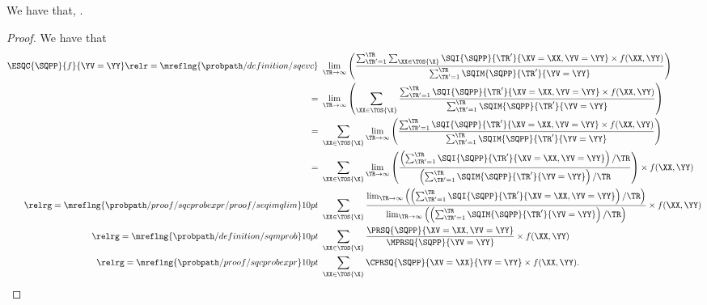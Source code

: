 \begin{proposition}
  We have that, \evsqcexprprop.%
\end{proposition}

\begin{proof}
  We have that
  \begin{align*}
    \ESQC{\SQPP}{f}{\YV = \YY} \relr = {\mreflng{\probpath/definition/sqevc}} \ &\lim_{\TR \rightarrow \infty}
    \left(
    \frac
    {\sum_{\TR' = 1}^{\TR}\sum_{\XX\in\TOS{\X}}\SQI{\SQPP}{\TR'}{\XV = \XX, \YV = \YY}\times f(\XX, \YY)}
    {\sum_{\TR' = 1}^{\TR}\SQIM{\SQPP}{\TR'}{\YV = \YY}}
    \right)\\
    = \ &\lim_{\TR \rightarrow \infty}
    \left(
    \sum_{\XX\in\TOS{\X}}
    \frac
    {\sum_{\TR' = 1}^{\TR}\SQI{\SQPP}{\TR'}{\XV = \XX, \YV = \YY}\times f(\XX, \YY)}
    {\sum_{\TR' = 1}^{\TR}\SQIM{\SQPP}{\TR'}{\YV = \YY}}
    \right)\\
    = \ &
    \sum_{\XX\in\TOS{\X}}
    \lim_{\TR \rightarrow \infty}
    \left(
    \frac
    {\sum_{\TR' = 1}^{\TR}\SQI{\SQPP}{\TR'}{\XV = \XX, \YV = \YY}\times f(\XX, \YY)}
    {\sum_{\TR' = 1}^{\TR}\SQIM{\SQPP}{\TR'}{\YV = \YY}}
    \right)\\
    = \ &
    \sum_{\XX\in\TOS{\X}}
    \lim_{\TR \rightarrow \infty}
    \left(
    \frac
    {\left({\sum_{\TR' = 1}^{\TR}\SQI{\SQPP}{\TR'}{\XV = \XX, \YV = \YY}}\right)/{\TR}}
    {\left(\sum_{\TR' = 1}^{\TR}\SQIM{\SQPP}{\TR'}{\YV = \YY}\right)/\TR}
    \right)
    \times f(\XX, \YY)\\
    \relrg = {\mreflng{\probpath/proof/sqcprobexpr/proof/seqimqlim}} 10pt \ & 
    \sum_{\XX\in\TOS{\X}}
    \frac
    {
      \lim_{\TR \rightarrow \infty}\left(
    \left({\sum_{\TR' = 1}^{\TR}\SQI{\SQPP}{\TR'}{\XV = \XX, \YV = \YY}}\right)/{\TR}\right)}
    {
      \lim_{\TR \rightarrow \infty}\left(
    \left(\sum_{\TR' = 1}^{\TR}\SQIM{\SQPP}{\TR'}{\YV = \YY}\right)/\TR\right)}
    \times f(\XX, \YY)
    \\
    \relrg = {\mreflng{\probpath/definition/sqmprob}} 10pt \ & 
    \sum_{\XX\in\TOS{\X}} \frac { \PRSQ{\SQPP}{\XV = \XX, \YV = \YY} } { \MPRSQ{\SQPP}{\YV = \YY} } 
    \times f(\XX, \YY) \\
    \relrg = {\mreflng{\probpath/proof/sqcprobexpr}} 10pt \ & 
    \sum_{\XX \in \TOS{\X}}\CPRSQ{\SQPP}{\XV = \XX}{\YV = \YY}\times f(\XX, \YY).
  \end{align*}
\end{proof}
